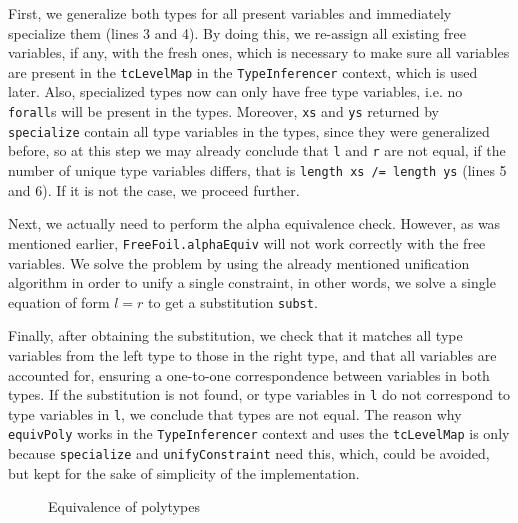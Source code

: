 First, we generalize both types for all present variables and immediately specialize them (lines 3 and 4). By doing this, we re-assign all existing free variables, if any, with the fresh ones, which is necessary to make sure all variables are present in the \texttt{tcLevelMap} in the \texttt{TypeInferencer} context, which is used later. Also, specialized types now can only have free type variables, i.e. no \texttt{forall}s will be present in the types. Moreover, \texttt{xs} and \texttt{ys} returned by \texttt{specialize} contain all type variables in the types, since they were generalized before, so at this step we may already conclude that \texttt{l} and \texttt{r} are not equal, if the number of unique type variables differs, that is \texttt{length xs /= length ys} (lines 5 and 6). If it is not the case, we proceed further.

Next, we actually need to perform the alpha equivalence check. However, as was mentioned earlier, \texttt{FreeFoil.alphaEquiv} will not work correctly with the free variables. We solve the problem by using the already mentioned unification algorithm in order to unify a single constraint, in other words, we solve a single equation of form $l = r$ to get a substitution \texttt{subst}.

Finally, after obtaining the substitution, we check that it matches all type variables from the left type to those in the right type, and that all variables are accounted for, ensuring a one-to-one correspondence between variables in both types. If the substitution is not found, or type variables in \texttt{l} do not correspond to type variables in \texttt{l}, we conclude that types are not equal. The reason why \texttt{equivPoly} works in the \texttt{TypeInferencer} context and uses the \texttt{tcLevelMap} is only because \texttt{specialize} and \texttt{unifyConstraint} need this, which, could be avoided, but kept for the sake of simplicity of the implementation.

\begin{figure}[H]
  \begin{prooftree*}
  \end{prooftree*}
  \caption{Equivalence of polytypes}
  \label{fig:equiv-poly-rule}
\end{figure}

